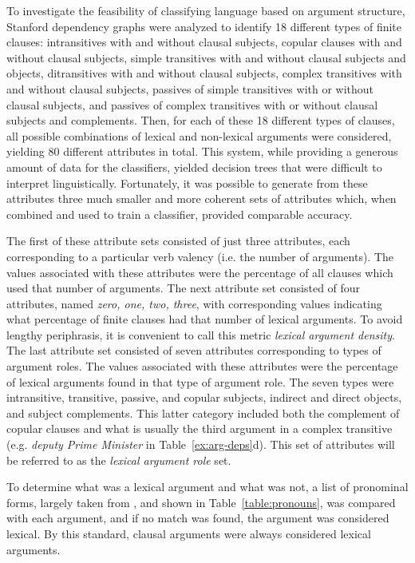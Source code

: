 \documentclass[main.tex]{subfiles}
\begin{document}
To investigate the feasibility of classifying language based on argument structure, Stanford dependency graphs were analyzed to identify 18 different types of finite clauses: intransitives with and without clausal subjects, copular clauses with and without clausal subjects, simple transitives with and without clausal subjects and objects, ditransitives with and without clausal subjects, complex transitives with and without clausal subjects, passives of simple transitives with or without clausal subjects, and passives of complex transitives with or without clausal subjects and complements. Then, for each of these 18 different types of clauses, all possible combinations of lexical and non-lexical arguments were considered, yielding 80 different attributes in total. This system, while providing a generous amount of data for the classifiers, yielded decision trees that were difficult to interpret linguistically. Fortunately, it was possible to generate from these attributes three much smaller and more coherent sets of attributes which, when combined and used to train a classifier, provided comparable accuracy.

The first of these attribute sets consisted of just three attributes, each corresponding to a particular verb valency (i.e. the number of arguments). The values associated with these attributes were the percentage of all clauses which used that number of arguments. The next attribute set consisted of four attributes, named \textit{zero, one, two, three}, with corresponding values indicating what percentage of finite clauses had that number of lexical arguments. To avoid lengthy periphrasis, it is convenient to call this metric \textit{lexical argument density}.  The last attribute set consisted of seven attributes corresponding to types of argument roles. The values associated with these attributes were the percentage of lexical arguments found in that type of argument role. The seven types were intransitive, transitive, passive, and copular subjects, indirect and direct objects, and subject complements. This latter category included both the complement of copular clauses and what is usually the third argument in a complex transitive (e.g. \textit{deputy Prime Minister} in Table~\ref{ex:arg-deps}d). This set of attributes will be referred to as the \textit{lexical argument role} set.

To determine what was a lexical argument and what was not, a list of pronominal forms, largely taken from \citet[Ch. 16]{celce-murcia:1999}, and shown in Table~\ref{table:pronouns}, was compared with each argument, and if no match was found, the argument was considered lexical. By this standard, clausal arguments were always considered lexical arguments. 
\end{document}
